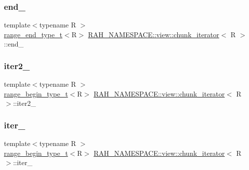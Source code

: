 \subsubsection{\texorpdfstring{end\_}{end\_}}
{\footnotesize\ttfamily template$<$typename R $>$ \\
\mbox{\hyperlink{namespace_r_a_h___n_a_m_e_s_p_a_c_e_aadeb8c12d454f4cc70bf80766871d3b2}{range\+\_\+end\+\_\+type\+\_\+t}}$<$R$>$ \mbox{\hyperlink{struct_r_a_h___n_a_m_e_s_p_a_c_e_1_1view_1_1chunk__iterator}{R\+A\+H\+\_\+\+N\+A\+M\+E\+S\+P\+A\+C\+E\+::view\+::chunk\+\_\+iterator}}$<$ R $>$\+::end\+\_\+}

\mbox{\label{struct_r_a_h___n_a_m_e_s_p_a_c_e_1_1view_1_1chunk__iterator_a7fae91da2b31a981b0fd591e138b262e}} 
\subsubsection{\texorpdfstring{iter2\_}{iter2\_}}
{\footnotesize\ttfamily template$<$typename R $>$ \\
\mbox{\hyperlink{namespace_r_a_h___n_a_m_e_s_p_a_c_e_a46705781d6869d5151141f871ced1e9c}{range\+\_\+begin\+\_\+type\+\_\+t}}$<$R$>$ \mbox{\hyperlink{struct_r_a_h___n_a_m_e_s_p_a_c_e_1_1view_1_1chunk__iterator}{R\+A\+H\+\_\+\+N\+A\+M\+E\+S\+P\+A\+C\+E\+::view\+::chunk\+\_\+iterator}}$<$ R $>$\+::iter2\+\_\+}

\mbox{\label{struct_r_a_h___n_a_m_e_s_p_a_c_e_1_1view_1_1chunk__iterator_a68b188dfca38a6eebd03ce2aee91c33e}} 
\subsubsection{\texorpdfstring{iter\_}{iter\_}}
{\footnotesize\ttfamily template$<$typename R $>$ \\
\mbox{\hyperlink{namespace_r_a_h___n_a_m_e_s_p_a_c_e_a46705781d6869d5151141f871ced1e9c}{range\+\_\+begin\+\_\+type\+\_\+t}}$<$R$>$ \mbox{\hyperlink{struct_r_a_h___n_a_m_e_s_p_a_c_e_1_1view_1_1chunk__iterator}{R\+A\+H\+\_\+\+N\+A\+M\+E\+S\+P\+A\+C\+E\+::view\+::chunk\+\_\+iterator}}$<$ R $>$\+::iter\+\_\+}

